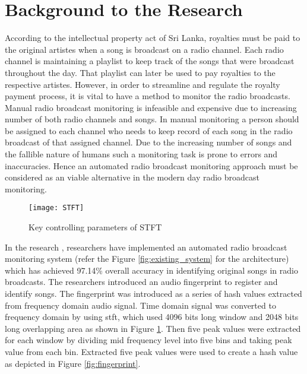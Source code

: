 \section{Background to the Research}
\vspace{12pt}

According to the intellectual property act of Sri Lanka\cite{CopyrightAct}, royalties must be paid to the original
artistes when a song is broadcast on a radio channel. Each radio channel is maintaining a playlist to keep track of
the songs that were broadcast throughout the day. That playlist can later be used to pay royalties to the respective
artistes. However, in order to streamline and regulate the royalty payment process, it is vital to have a method to monitor the radio 
broadcasts. Manual radio broadcast monitoring is infeasible and expensive due to increasing number of both radio 
channels and songs. In manual monitoring a person should be assigned to each channel who needs to keep record of each 
song in the radio broadcast of that assigned channel. Due to the increasing number of songs and the fallible nature of
humans such a monitoring task is prone to errors and inaccuracies. Hence an automated radio broadcast 
monitoring approach must be considered as an viable alternative in the modern day radio broadcast monitoring.
\vspace{12pt}

\begin{figure}[H]
    \centering
    \texttt{[image: STFT]}
    \caption{Key controlling parameters of STFT\cite{Nishan}}
    \label{fig:stft}
\end{figure}
\vspace{12pt}

In the research \cite{Nishan}, researchers have implemented an
automated radio broadcast monitoring system (refer the Figure \ref{fig:existing_system} for the architecture) which has 
achieved 97.14\% overall accuracy in identifying original songs
in radio broadcasts. The researchers introduced an audio fingerprint to register and identify songs. The fingerprint was
introduced as a series of hash values extracted from frequency domain audio signal. Time domain signal was converted to 
frequency domain by using \ac{stft}, which used 4096 bits long window and 2048
bits long overlapping area as shown in Figure \ref{fig:stft}. Then five peak values were extracted for each window by 
dividing mid frequency level into five bins and taking peak value from each bin. Extracted five peak values were used to 
create a hash value as depicted in Figure \ref{fig:fingerprint}. 

